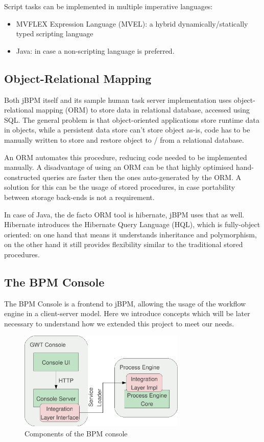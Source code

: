 Script tasks can be implemented in multiple imperative languages:

\begin{itemize}
\item MVFLEX Expression Language (MVEL): a hybrid dynamically/statically typed scripting language
\item Java: in case a non-scripting language is preferred.
\end{itemize}

\subsection{Object-Relational Mapping}

Both jBPM itself and its sample human task server implementation uses
object-relational mapping (ORM) to store data in relational database, accessed
using SQL. The general problem is that object-oriented applications store
runtime data in objects, while a persistent data store can't store object
as-is, code has to be manually written to store and restore object to / from a
relational database.

An ORM automates this procedure, reducing code needed to be implemented
manually. A disadvantage of using an ORM can be that highly optimised
hand-constructed queries are faster then the ones auto-generated by the ORM. A
solution for this can be the usage of stored procedures, in case portability
between storage back-ends is not a requirement.

In case of Java, the de facto ORM tool is hibernate, jBPM uses that as well.
Hibernate introduces the Hibernate Query Language (HQL), which is fully-object
oriented: on one hand that means it understands inheritance and polymorphism,
on the other hand it still provides flexibility similar to the traditional
stored procedures.

\subsection{The BPM Console}
\label{sec:bpm-console}

The BPM Console is a frontend to jBPM, allowing the usage of the workflow
engine in a client-server model. Here we introduce concepts which will be later
necessary to understand how we extended this project to meet our needs.


\begin{figure}[H]
\centering
\includegraphics[width=300px,keepaspectratio]{bpm-console.pdf}
\caption{Components of the BPM console}
\label{fig:bpm-console}
\end{figure}

